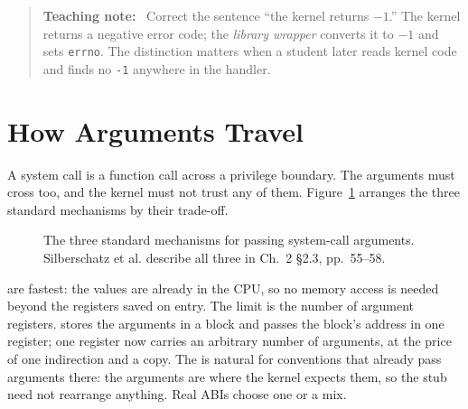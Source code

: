 \documentclass[11pt]{article}
\newenvironment{teachingaside}{\begin{quote}\small\color{primary-gold}\textbf{Teaching note:}\ }{\end{quote}}
\begin{document}
\begin{teachingaside}
Correct the sentence ``the kernel returns $-1$.'' The kernel returns a negative error code; the \emph{library wrapper} converts it to $-1$ and sets \texttt{errno}. The distinction matters when a student later reads kernel code and finds no \texttt{-1} anywhere in the handler.
\end{teachingaside}

\section{How Arguments Travel}

A system call is a function call across a privilege boundary. The arguments must cross too, and the kernel must not trust any of them. Figure~\ref{fig:three-ways} arranges the three standard mechanisms by their trade-off.

\begin{figure}[h]
\centering
{}
\caption{The three standard mechanisms for passing system-call arguments. Silberschatz et al. describe all three in Ch.~2 \S2.3, pp.~55--58.}
\label{fig:three-ways}
\end{figure}

 are fastest: the values are already in the CPU, so no memory access is needed beyond the registers saved on entry. The limit is the number of argument registers.  stores the arguments in a block and passes the block's address in one register; one register now carries an arbitrary number of arguments, at the price of one indirection and a copy. The  is natural for conventions that already pass arguments there: the arguments are where the kernel expects them, so the stub need not rearrange anything. Real ABIs choose one or a mix.
\end{document}
